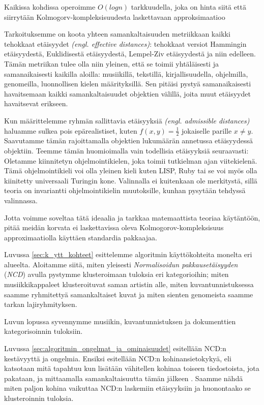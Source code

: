\documentclass[12pt,finnish]{tktltiki2}
\theoremstyle{definition}
\theoremstyle{remark}
\newcommand{\engl}[1]{\emph{(engl. #1)}}
\begin{document}
  Kaikissa kohdissa  operoimme $O(log n)$ tarkkuudella, joka on hinta siitä että siirrytään Kolmogorv-kompleksisuudesta laskettavaan approksimaatioo

  Tarkoituksemme on koota yhteen samankaltaisuuden metriikkaan kaikki tehokkaat etäisyydet \engl{effective distances}: tehokkaat versiot Hammingin etäisyydestä, Euklidisestä etäisyydestä, Lempel-Ziv etäisyydestä ja niin edelleen.
  Tämän metriikan tulee olla niin yleinen, että se toimii yhtäläisesti ja samanaikaisesti kaikilla aloilla: musiikillä, tekstillä, kirjallisuudella, ohjelmilla, genomeilla, luonnollisen kielen määrityksillä.
  Sen pitäisi pystyä samanaikaisesti havaitsemaan kaikki samankaltaisuudet objektien välillä, joita muut etäisyydet havaitsevat erikseen.

  Kun määrittelemme ryhmän sallittavia etäisyyksiä \engl{admissible distances} haluamme sulkea pois epärealistiset, kuten $f(x,y) = \frac{1}{2}$ jokaiselle parille $x \neq y$.
  Saavutamme tämän rajoittamalla objektien lukumäärän annetussa etäisyydessä objektiin.
  Teemme tämän huomioimalla vain todellisia etäisyyksiä seuraavasti: Oletamme kiinnitetyn ohjelmointikielen, joka toimii tutkielman ajan viitekielenä.
  Tämä ohjelmointikieli voi olla yleinen kieli kuten LISP, Ruby tai se voi myös olla kiinitetty universaali Turingin kone. \cite{CV05,cilibrasi2007google}
  Valinnalla ei kuitenkaan ole merkitystä, sillä teoria on invariantti ohjelmointikielin muutoksille, kunhan pysytään tehdyssä valinnassa.


Jotta voimme soveltaa tätä ideaalia ja tarkkaa matemaattista teoriaa käytäntöön, pitää meidän korvata ei laskettavissa oleva Kolmogorov-kompleksisuus approximaatiolla käyttäen standardia pakkaajaa.

\label{par:intro-3}
  Luvussa \ref{sec:k_ytt_kohteet} esittelemme algoritmin käyttökohteita monelta eri alueelta.
  Aloitamme siitä, miten yleisesti \emph{Normalisoidun pakkausetäisyyden} (\emph{NCD}) avulla pystymme klusteroimaan tuloksia eri kategorioihin; miten musiikkikappaleet klusteroituvat saman artistin alle, miten kuvantunnistuksessa saamme ryhmitettyä samankaltaiset kuvat ja miten sienten genomeista saamme tarkan lajiryhmityksen.


  Luvun lopussa syvennymme musiikin, kuvantunnistuksen ja dokumenttien kategorisoinnin tuloksiin.


\label{par:intro-4}
  Luvussa \ref{sec:algoritmin_ongelmat_ja_ominaisuudet} esitellään NCD:n kestävyyttä ja ongelmia.
  Ensiksi esitellään NCD:n kohinansietokykyä, eli katsotaan mitä tapahtuu kun lisätään vähitellen kohinaa toiseen tiedostoista, jota pakataan, ja mittaamalla samankaltaisuutta tämän jälkeen \cite{4167725}.
  Saamme nähdä miten paljon kohina vaikuttaa NCD:n laskemiin etäisyyksiin ja huonontaako se klusteroinnin tuloksia.
\end{document}
